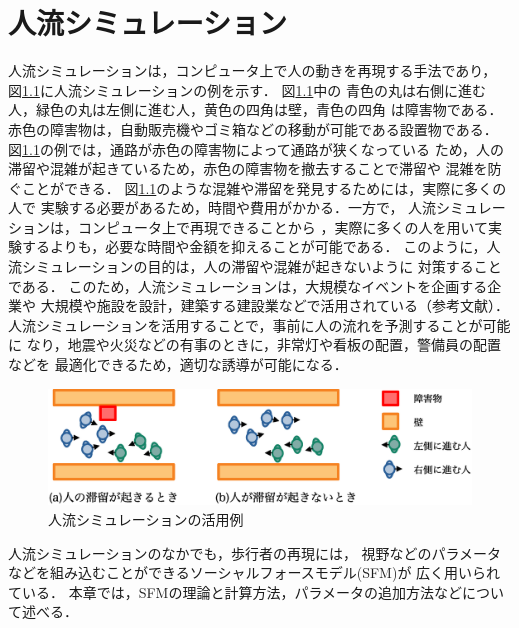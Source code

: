 
\newcommand{\eq}[1]{式（\ref{eq:#1}）}
\chapter{人流シミュレーション}
\label{sec:background}
人流シミュレーションは，コンピュータ上で人の動きを再現する手法であり，
図\ref{fig:jinryu_image}に人流シミュレーションの例を示す．
図\ref{fig:jinryu_image}中の
青色の丸は右側に進む人，緑色の丸は左側に進む人，黄色の四角は壁，青色の四角
は障害物である．
赤色の障害物は，自動販売機やゴミ箱などの移動が可能である設置物である．
図\ref{fig:jinryu_image}の例では，通路が赤色の障害物によって通路が狭くなっている
ため，人の滞留や混雑が起きているため，赤色の障害物を撤去することで滞留や
混雑を防ぐことができる．
図\ref{fig:jinryu_image}のような混雑や滞留を発見するためには，実際に多くの人で
実験する必要があるため，時間や費用がかかる．一方で，
人流シミュレーションは，コンピュータ上で再現できることから
，実際に多くの人を用いて実験するよりも，必要な時間や金額を抑えることが可能である．
このように，人流シミュレーションの目的は，人の滞留や混雑が起きないように
対策することである．
このため，人流シミュレーションは，大規模なイベントを企画する企業や
大規模や施設を設計，建築する建設業などで活用されている（参考文献）．
人流シミュレーションを活用することで，事前に人の流れを予測することが可能に
なり，地震や火災などの有事のときに，非常灯や看板の配置，警備員の配置などを
最適化できるため，適切な誘導が可能になる．
%
\begin{figure}[b]
    \begin{center}
     \includegraphics[width=14cm,clip]{figure/jinryu_image2_r2.eps}
     \caption{人流シミュレーションの活用例}
     \label{fig:jinryu_image}
    \end{center}
\end{figure}
%
人流シミュレーションのなかでも，歩行者の再現には，
視野などのパラメータなどを組み込むことができるソーシャルフォースモデル(SFM)が
広く用いられている．
本章では，SFMの理論と計算方法，パラメータの追加方法などについて述べる．

